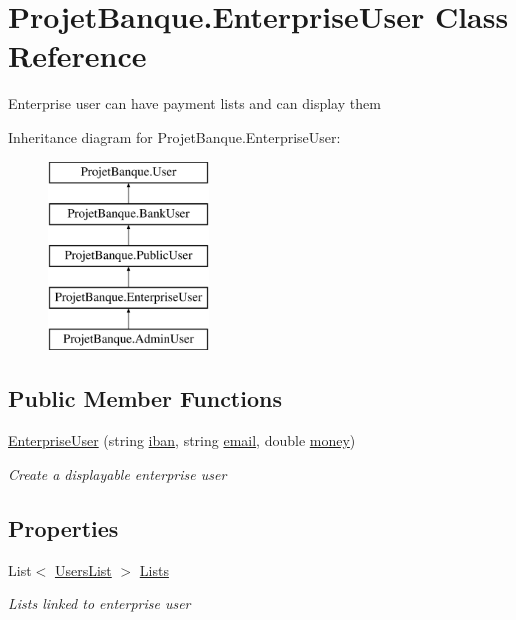\hypertarget{class_projet_banque_1_1_enterprise_user}{}\section{Projet\+Banque.\+Enterprise\+User Class Reference}
\label{class_projet_banque_1_1_enterprise_user}


Enterprise user can have payment lists and can display them  


Inheritance diagram for Projet\+Banque.\+Enterprise\+User\+:\begin{figure}[H]
\begin{center}
\leavevmode
\includegraphics[height=5.000000cm]{class_projet_banque_1_1_enterprise_user}
\end{center}
\end{figure}
\subsection*{Public Member Functions}
\begin{DoxyCompactItemize}
\item 
\mbox{\hyperlink{class_projet_banque_1_1_enterprise_user_a2d4bdf759ac401ac4c7a41772173c2a9}{Enterprise\+User}} (string \mbox{\hyperlink{class_projet_banque_1_1_user_a52d4f7f22889d33e196357127ceb3ec3}{iban}}, string \mbox{\hyperlink{class_projet_banque_1_1_user_a7ee066f61ff3a59b05f003709548428a}{email}}, double \mbox{\hyperlink{class_projet_banque_1_1_bank_user_a070a143e326a9bec28b4123a8e0e7d8f}{money}})
\begin{DoxyCompactList}\small\item\em Create a displayable enterprise user \end{DoxyCompactList}\end{DoxyCompactItemize}
\subsection*{Properties}
\begin{DoxyCompactItemize}
\item 
List$<$ \mbox{\hyperlink{class_projet_banque_1_1_users_list}{Users\+List}} $>$ \mbox{\hyperlink{class_projet_banque_1_1_enterprise_user_a47de23d9b9f54650da55f8910e4f7bb7}{Lists}}
\begin{DoxyCompactList}\small\item\em Lists linked to enterprise user \end{DoxyCompactList}\end{DoxyCompactItemize}
